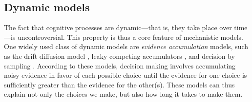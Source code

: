 
\subsection{Dynamic models}

The fact that cognitive processes are dynamic---that is, they take place over time---is uncontroversial. This property is thus a core feature of mechanistic models. One widely used class of dynamic models are \emph{evidence accumulation} models, such as the drift diffusion model \citep{ratcliff1978theory}, leaky competing accumulators \citep{usher2001time}, and decision by sampling \citep{stewart2006decision}. According to these models, decision making involves accumulating noisy evidence in favor of each possible choice until the evidence for one choice is sufficiently greater than the evidence for the other(s). These models can thus explain not only the choices we make, but also how long it takes to make them.



